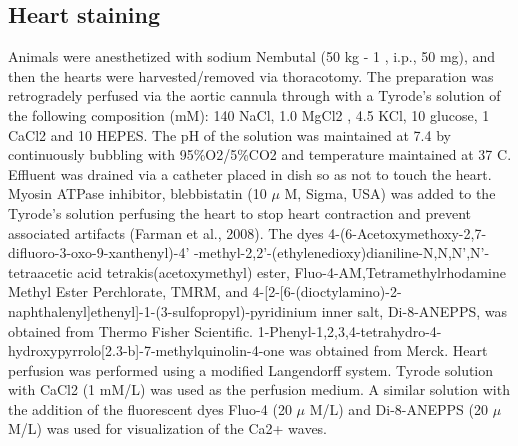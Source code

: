 \documentclass[a4paper,12pt]{article}
\begin{document}
\subsection{Heart staining}
Animals were anesthetized with sodium Nembutal (50 kg - 1 , i.p., 50 mg), and then the hearts were harvested/removed via thoracotomy.
The preparation was retrogradely perfused via the aortic cannula through with a Tyrode’s solution of the following composition (mM): 140 NaCl, 1.0 MgCl2 , 4.5 KCl, 10 glucose, 1 CaCl2 and 10 HEPES.
The pH of the solution was maintained at 7.4 by continuously bubbling with 95\%O2/5\%CO2 and temperature maintained at 37 C.
Effluent was drained via a catheter placed in dish so as not to touch the heart. Myosin ATPase inhibitor, blebbistatin (10 $\mu$ M, Sigma, USA) was added to the Tyrode’s solution perfusing the heart to stop heart contraction and prevent associated artifacts (Farman et al., 2008). The dyes 4-(6-Acetoxymethoxy-2,7-difluoro-3-oxo-9-xanthenyl)-4' -methyl-2,2'-(ethylenedioxy)dianiline-N,N,N',N'-tetraacetic acid tetrakis(acetoxymethyl) ester, Fluo-4-AM,Tetramethylrhodamine Methyl Ester Perchlorate, TMRM, and 4-[2-[6-(dioctylamino)-2-naphthalenyl]ethenyl]-1-(3-sulfopropyl)-pyridinium inner salt, Di-8-ANEPPS, was obtained from Thermo Fisher Scientific.
1-Phenyl-1,2,3,4-tetrahydro-4-hydroxypyrrolo[2.3-b]-7-methylquinolin-4-one was obtained from Merck.
Heart perfusion was performed using a modified Langendorff system. Tyrode solution with CaCl2 (1 mM/L) was used as the perfusion medium.
A similar solution with the addition of the fluorescent dyes Fluo-4 (20 $\mu$ M/L) and Di-8-ANEPPS (20 $\mu$ M/L) was used for visualization of the Ca2+ waves.
\end{document}
